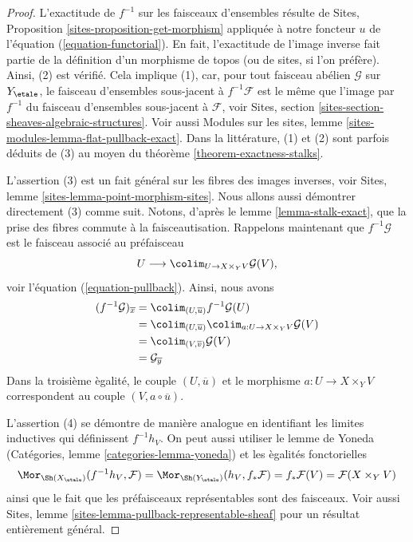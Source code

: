 \begin{proof}
L'exactitude de $f^{-1}$ sur les faisceaux d'ensembles r\'esulte de
Sites, Proposition \ref{sites-proposition-get-morphism}
appliqu\'ee \`a notre foncteur $u$ de l'\'equation (\ref{equation-functorial}).
En fait, l'exactitude de l'image inverse fait partie de la d\'efinition d'un
morphisme de topos (ou de sites, si l'on pr\'ef\`ere). Ainsi, (2) est v\'erifi\'e.
Cela implique (1), car, pour tout faisceau ab\'elien $\mathcal{G}$ sur
$Y_\etale$,
le faisceau d'ensembles sous-jacent \`a $f^{-1}\mathcal{F}$ est le m\^eme
que l'image par $f^{-1}$ du faisceau d'ensembles sous-jacent \`a $\mathcal{F}$, voir
Sites, section \ref{sites-section-sheaves-algebraic-structures}.
Voir aussi
Modules sur les sites, lemme \ref{sites-modules-lemma-flat-pullback-exact}.
Dans la litt\'erature, (1) et (2) sont parfois d\'eduits de (3) au moyen du
th\'eor\`eme \ref{theorem-exactness-stalks}.

\medskip\noindent
L'assertion (3) est un fait g\'en\'eral sur les fibres des images inverses, voir
Sites, lemme \ref{sites-lemma-point-morphism-sites}.
Nous allons aussi d\'emontrer directement (3) comme suit. Notons, d'apr\`es le
lemme \ref{lemma-stalk-exact},
que la prise des fibres commute \`a la faisceautisation.
Rappelons maintenant que $f^{-1}\mathcal{G}$ est le faisceau
associ\'e au pr\'efaisceau
$$
U \longrightarrow \colim_{U \to X \times_Y V} \mathcal{G}(V),
$$
voir l'\'equation (\ref{equation-pullback}).
Ainsi, nous avons
\begin{align*}
(f^{-1}\mathcal{G})_{\overline{x}}
& = \colim_{(U, \overline{u})} f^{-1}\mathcal{G}(U) \\
& = \colim_{(U, \overline{u})}
\colim_{a : U \to X \times_Y V} \mathcal{G}(V) \\
& = \colim_{(V, \overline{v})} \mathcal{G}(V) \\
& = \mathcal{G}_{\overline{y}}
\end{align*}
Dans la troisi\`eme \`egalit\'e, le couple $(U, \overline{u})$ et le morphisme
$a : U \to X \times_Y V$ correspondent au couple $(V, a \circ \overline{u})$.

\medskip\noindent
L'assertion (4) se d\'emontre de mani\`ere analogue en identifiant les limites inductives
qui d\'efinissent $f^{-1}h_V$. On peut aussi utiliser
le lemme de Yoneda (Catégories, lemme \ref{categories-lemma-yoneda})
et les \`egalit\'es fonctorielles
$$
\Mor_{\Sh(X_\etale)}(f^{-1}h_V, \mathcal{F}) =
\Mor_{\Sh(Y_\etale)}(h_V, f_*\mathcal{F}) =
f_*\mathcal{F}(V) = \mathcal{F}(X \times_Y V)
$$
ainsi que le fait que les pr\'efaisceaux repr\'esentables sont des faisceaux. Voir aussi
Sites, lemme \ref{sites-lemma-pullback-representable-sheaf}
pour un r\'esultat enti\`erement g\'en\'eral.
\end{proof}

